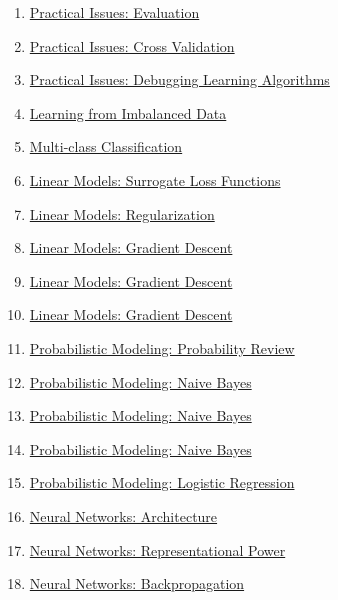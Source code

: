 \documentclass[11pt]{article}
\begin{document}
\begin{enumerate}
	\item  \href{https://mp.weixin.qq.com/s/ucoSahHODfeR4vt8RUHcWA}{Practical Issues: Evaluation } %
	\item  \href{https://mp.weixin.qq.com/s/L4EoALGmgQODdA9ZN9J6ew}{Practical Issues: Cross Validation} %
	\item  \href{https://mp.weixin.qq.com/s/rT1qPZrhUg1guVhVGFqrcg}{Practical Issues: Debugging Learning Algorithms} %
	\item  \href{https://mp.weixin.qq.com/s/270D0YqagB01gi7rSoqUfA}{Learning from Imbalanced Data} %
	\item  \href{https://mp.weixin.qq.com/s/NyqflwYNeUJvFT8DYkesPw}{Multi-class Classification} %
	\item  \href{https://mp.weixin.qq.com/s/0ApIaXbp4FjcqiT_f-pCHg}{Linear Models: Surrogate Loss Functions} %
	\item  \href{https://mp.weixin.qq.com/s/h1B-yyEV9_uPNtBPTpa8uA}{Linear Models: Regularization} %
	\item  \href{https://mp.weixin.qq.com/s/KSNWDx0uRxLDbPFqOpTnaA}{Linear Models: Gradient Descent } %
	\item  \href{https://mp.weixin.qq.com/s/OBT31w9pyMJmzTygIX_zTQ}{Linear Models: Gradient Descent } %
	\item  \href{https://mp.weixin.qq.com/s/hEjyJlBVRFJU3T3OO2-yNg}{Linear Models: Gradient Descent } %
	\item  \href{https://mp.weixin.qq.com/s/StHIUV8xbdlcQZzap8P0RA}{Probabilistic Modeling: Probability Review} %
	\item  \href{https://mp.weixin.qq.com/s/Z9fOxTJJiezSZ0SI0KWMXw}{Probabilistic Modeling: Naive Bayes } %
	\item  \href{https://mp.weixin.qq.com/s/_FSzMosXfjDIUgOMRQ9Bug}{Probabilistic Modeling: Naive Bayes } %
	\item  \href{https://mp.weixin.qq.com/s/YFEu86vNiQmRTiv5a0Ru7Q}{Probabilistic Modeling: Naive Bayes } %
	\item  \href{https://mp.weixin.qq.com/s/--57mhHFR-ufYI84qxdz4g}{Probabilistic Modeling: Logistic Regression} %
	\item  \href{https://mp.weixin.qq.com/s/lTufkcVs-2XomUT82zgF1w}{Neural Networks: Architecture} %
	\item  \href{https://mp.weixin.qq.com/s/KINTPsExZ_iCD5R7e0lE4w}{Neural Networks: Representational Power} %
	\item  \href{https://mp.weixin.qq.com/s/76s7yYxIrzWwFzVOOxy9UQ}{Neural Networks: Backpropagation } %

\end{enumerate}
\end{document}
